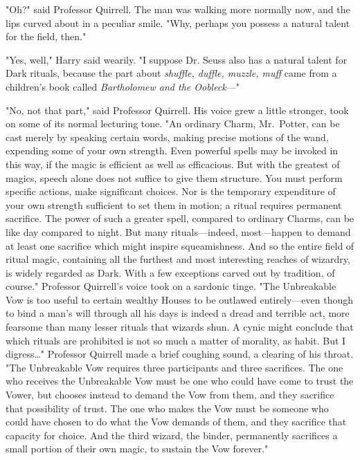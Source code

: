 "Oh?" said Professor Quirrell. The man was walking more normally now, and the 
lips curved about in a peculiar smile. "Why, perhaps you possess a natural 
talent for the field, then."

"Yes, well," Harry said wearily. "I suppose Dr. Seuss also has a natural talent 
for Dark rituals, because the part about \emph{shuffle, duffle, muzzle, muff} 
came from a children's book called \emph{Bartholomew and the Oobleck}---"

"No, not that part," said Professor Quirrell. His voice grew a little stronger, 
took on some of its normal lecturing tone. "An ordinary Charm, Mr.~Potter, can 
be cast merely by speaking certain words, making precise motions of the wand, 
expending some of your own strength. Even powerful spells may be invoked in 
this way, if the magic is efficient as well as efficacious. But with the 
greatest of magics, speech alone does not suffice to give them structure. You 
must perform specific actions, make significant choices. Nor is the temporary 
expenditure of your own strength sufficient to set them in motion; a ritual 
requires permanent sacrifice. The power of such a greater spell, compared to 
ordinary Charms, can be like day compared to night. But many rituals---indeed, 
most---happen to demand at least one sacrifice which might inspire 
squeamishness. And so the entire field of ritual magic, containing all the 
furthest and most interesting reaches of wizardry, is widely regarded as Dark. 
With a few exceptions carved out by tradition, of course." Professor Quirrell's 
voice took on a sardonic tinge. "The Unbreakable Vow is too useful to certain 
wealthy Houses to be outlawed entirely---even though to bind a man's will 
through all his days is indeed a dread and terrible act, more fearsome than 
many lesser rituals that wizards shun. A cynic might conclude that which 
rituals are prohibited is not so much a matter of morality, as habit. But I 
digress{\ldots}" Professor Quirrell made a brief coughing sound, a clearing of 
his throat. "The Unbreakable Vow requires three participants and three 
sacrifices. The one who receives the Unbreakable Vow must be one who could have 
come to trust the Vower, but chooses instead to demand the Vow from them, and 
they sacrifice that possibility of trust. The one who makes the Vow must be 
someone who could have chosen to do what the Vow demands of them, and they 
sacrifice that capacity for choice. And the third wizard, the binder, 
permanently sacrifices a small portion of their own magic, to sustain the Vow 
forever."

